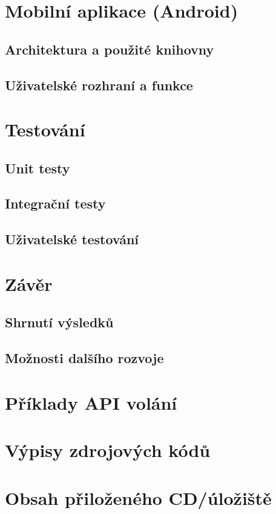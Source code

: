 \documentclass[12pt, a4paper]{report}
\begin{document}
\chapter{Mobilní aplikace (Android)}
\section{Architektura a použité knihovny}
\section{Uživatelské rozhraní a funkce}

\chapter{Testování}
\section{Unit testy}
\section{Integrační testy}
\section{Uživatelské testování}

\chapter{Závěr}
\section{Shrnutí výsledků}
\section{Možnosti dalšího rozvoje}


\appendix
\chapter{Příklady API volání}
\chapter{Výpisy zdrojových kódů}
\chapter{Obsah přiloženého CD/úložiště}

\cleardoublepage
{}
\end{document}
